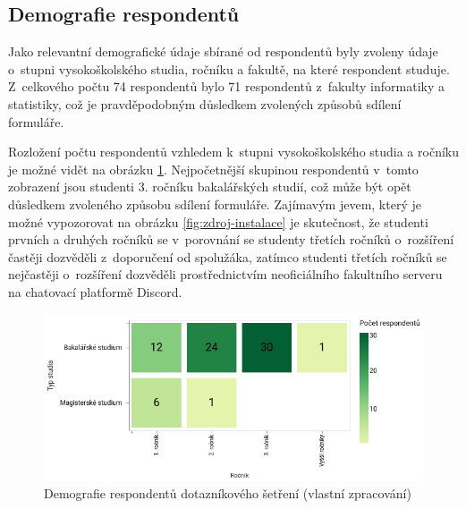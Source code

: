 \subsection{Demografie respondentů}

Jako relevantní demografické údaje sbírané od respondentů byly zvoleny údaje o~stupni vysokoškolského studia, ročníku a fakultě, na které respondent studuje. Z~celkového počtu 74 respondentů bylo 71 respondentů z~fakulty informatiky a statistiky, což je pravděpodobným důsledkem zvolených způsobů sdílení formuláře.

Rozložení počtu respondentů vzhledem k~stupni vysokoškolského studia a ročníku je možné vidět na obrázku \ref{fig:demografie-respondentu}. Nejpočetnější skupinou respondentů v~tomto zobrazení jsou studenti 3. ročníku bakalářských studií, což může být opět důsledkem zvoleného způsobu sdílení formuláře. Zajímavým jevem, který je možné vypozorovat na obrázku \ref{fig:zdroj-instalace} je skutečnost, že studenti prvních a druhých ročníků se v~porovnání se studenty třetích ročníků o~rozšíření častěji dozvěděli z~doporučení od spolužáka, zatímco studenti třetích ročníků se nejčastěji o~rozšíření dozvěděli prostřednictvím neoficiálního fakultního serveru na chatovací platformě Discord. 

\begin{figure}[htbp!]\centering
    \includegraphics[width=\textwidth]{img/demografie-respondentu.png}
    \caption{Demografie respondentů dotazníkového šetření (vlastní zpracování)}
    \label{fig:demografie-respondentu}
\end{figure}

